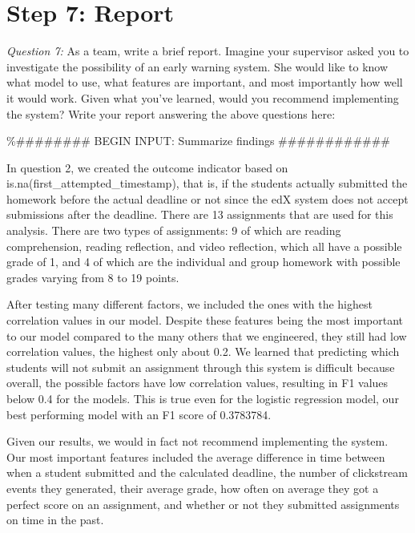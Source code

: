 \documentclass[
]{article}
\begin{document}
\hypertarget{step-7-report}{%
\section{Step 7: Report}\label{step-7-report}}

\emph{Question 7:} As a team, write a brief report. Imagine your
supervisor asked you to investigate the possibility of an early warning
system. She would like to know what model to use, what features are
important, and most importantly how well it would work. Given what
you've learned, would you recommend implementing the system? Write your
report answering the above questions here:

\%\#\#\#\#\#\#\#\# BEGIN INPUT: Summarize findings
\#\#\#\#\#\#\#\#\#\#\#\#

In question 2, we created the outcome indicator based on
is.na(first\_attempted\_timestamp), that is, if the students actually
submitted the homework before the actual deadline or not since the edX
system does not accept submissions after the deadline. There are 13
assignments that are used for this analysis. There are two types of
assignments: 9 of which are reading comprehension, reading reflection,
and video reflection, which all have a possible grade of 1, and 4 of
which are the individual and group homework with possible grades varying
from 8 to 19 points.

After testing many different factors, we included the ones with the
highest correlation values in our model. Despite these features being
the most important to our model compared to the many others that we
engineered, they still had low correlation values, the highest only
about 0.2. We learned that predicting which students will not submit an
assignment through this system is difficult because overall, the
possible factors have low correlation values, resulting in F1 values
below 0.4 for the models. This is true even for the logistic regression
model, our best performing model with an F1 score of 0.3783784.

Given our results, we would in fact not recommend implementing the
system. Our most important features included the average difference in
time between when a student submitted and the calculated deadline, the
number of clickstream events they generated, their average grade, how
often on average they got a perfect score on an assignment, and whether
or not they submitted assignments on time in the past.
\end{document}
